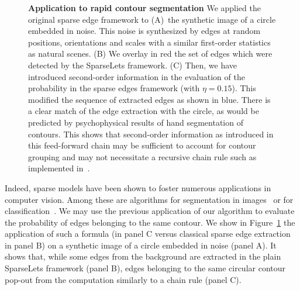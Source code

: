 \documentclass[a4paper, 11pt]{book}
\begin{document}
\begin{figure}[ht!]
\caption{{\bf Application to rapid contour segmentation}
We applied the original sparse edge framework to \textsf{(A)}~the synthetic image of a circle embedded in noise. This noise is synthesized by edges at random positions, orientations and scales with a similar first-order statistics as natural scenes. %
\textsf{(B)} We overlay in red the set of edges which were detected by the SparseLets framework.
\textsf{(C)}  Then, we have introduced second-order information in the evaluation of the probability in the sparse edges framework (with $\eta=0.15$). This modified the sequence of extracted edges as shown in blue. There is a clear match of the  edge extraction with the circle, as would be predicted by psychophysical results of hand segmentation of contours. %
This shows that second-order information as introduced in this feed-forward chain  may be sufficient to account for contour grouping and may not necessitate a recursive chain rule such as implemented in~\citet{Geisler01}.
\label{fig:segmentation}}%
\end{figure}%
Indeed, sparse models have been shown to foster numerous applications in computer vision.
Among these are algorithms for segmentation in images~\citep{Spratling13} or for classification~\citep{Spratling13bicy,Dumoulin14}.
We may use the previous application of our algorithm to evaluate the probability of edges belonging to the same contour.
We show in Figure~\ref{fig:segmentation} the application of such a formula (in panel C versus classical sparse edge extraction in panel B) on a synthetic image of a circle embedded in noise (panel A). %
It shows that, while some edges from the background are extracted in the plain SparseLets framework (panel B), edges belonging to the same circular contour pop-out from the computation similarly to a chain rule (panel C).
\end{document}
